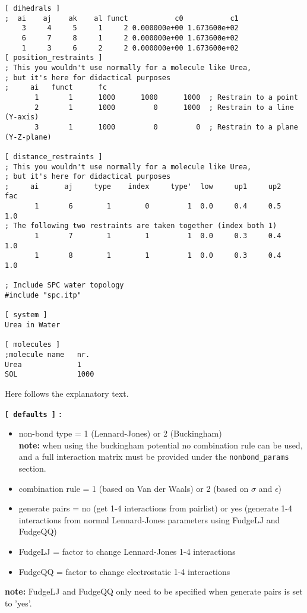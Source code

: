 {\begin{verbatim}
[ dihedrals ]
;  ai    aj    ak    al funct           c0           c1
    3     4     5     1     2 0.000000e+00 1.673600e+02 
    6     7     8     1     2 0.000000e+00 1.673600e+02 
    1     3     6     2     2 0.000000e+00 1.673600e+02  
[ position_restraints ]
; This you wouldn't use normally for a molecule like Urea,
; but it's here for didactical purposes
;     ai   funct      fc
       1       1      1000      1000      1000  ; Restrain to a point
       2       1      1000         0      1000  ; Restrain to a line (Y-axis)
       3       1      1000         0         0  ; Restrain to a plane (Y-Z-plane)
   
[ distance_restraints ]
; This you wouldn't use normally for a molecule like Urea,
; but it's here for didactical purposes
;     ai      aj     type    index     type'  low     up1     up2     fac
       1       6        1        0         1  0.0     0.4     0.5     1.0 
; The following two restraints are taken together (index both 1)
       1       7        1        1         1  0.0     0.3     0.4     1.0 
       1       8        1        1         1  0.0     0.3     0.4     1.0 

; Include SPC water topology
#include "spc.itp"

[ system ]
Urea in Water

[ molecules ]
;molecule name   nr.
Urea             1
SOL              1000
\end{verbatim}}
Here follows the explanatory text.

{\bf \verb'[ defaults ]' :}
\begin{itemize}
\item non-bond type = 1 (Lennard-Jones) or 2 (Buckingham)\\
{\bf note:} when using the buckingham potential no combination rule can
be used, and a full interaction matrix must be provided under the 
{\tt nonbond\_params} section.
\item combination rule = 1 (based on Van der Waals) or 2 (based on
$\sigma$ and $\epsilon$)
\item generate pairs = no (get 1-4 interactions from pairlist) or yes
(generate 1-4 interactions from normal Lennard-Jones parameters using
FudgeLJ and FudgeQQ)
\item FudgeLJ = factor to change Lennard-Jones 1-4 interactions
\item FudgeQQ = factor to change electrostatic 1-4 interactions
\end{itemize}
{\bf note:} FudgeLJ and FudgeQQ only need to be specified when
generate pairs is set to 'yes'.

